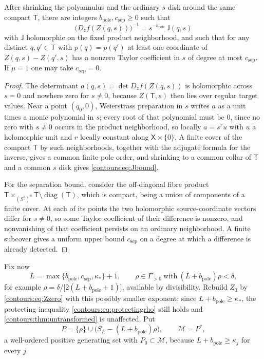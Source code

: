 \documentclass[11pt,letterpaper]{article}
\theoremstyle{definition}
\theoremstyle{remark}
\numberwithin{equation}{section}
\begin{document}
\begin{lemma}
\label{contours:lem:radialbounds}
After shrinking the polyannulus and the ordinary $s$ disk around the same compact
$\mathsf T$, there are integers $b_{\mathrm{pole}},c_{\mathrm{sep}}\ge0$ such
that
\begin{equation}\label{contours:eq:Jbound}
  \bigl(D_zf(Z(q,s))\bigr)^{-1}=s^{-b_{\mathrm{pole}}}\,\mathsf J(q,s)
\end{equation}
with $\mathsf J$ holomorphic on the fixed product neighborhood, and such that
for any distinct $q,q'\in\mathsf T$ with $p(q)=p(q')$ at least one coordinate of
$Z(q,s)-Z(q',s)$ has a nonzero Taylor coefficient in $s$ of degree at most
$c_{\mathrm{sep}}$. If $\mu=1$ one may take $c_{\mathrm{sep}}=0$.
\end{lemma}
\begin{proof}
The determinant $a(q,s)=\det D_zf(Z(q,s))$ is holomorphic across $s=0$ and
nowhere zero for $s\ne0$, because $Z(\mathsf T,s)$ then lies over regular target
values. Near a point $(q_0,0)$, Weierstrass preparation in $s$ writes $a$ as a
unit times a monic polynomial in $s$; every root of that polynomial must be $0$,
since no zero with $s\ne0$ occurs in the product neighborhood, so locally
$a=s^ru$ with $u$ a holomorphic unit and $r$ locally constant along
$\mathsf X\times\{0\}$. A finite cover of the compact $\mathsf T$ by such
neighborhoods, together with the adjugate formula for the inverse, gives a
common finite pole order, and shrinking to a common collar of $\mathsf T$ and a
common $s$ disk gives \eqref{contours:eq:Jbound}.

For the separation bound, consider the off-diagonal fibre product
$\mathsf T\times_{(S^1)^n}\mathsf T\setminus\operatorname{diag}(\mathsf T)$,
which is compact, being a union of components of a finite cover. At each of its
points the two holomorphic source-coordinate vectors differ for $s\ne0$, so some
Taylor coefficient of their difference is nonzero, and nonvanishing of that
coefficient persists on an ordinary neighborhood. A finite subcover gives a
uniform upper bound $c_{\mathrm{sep}}$ on a degree at which a difference is
already detected.
\end{proof}

Fix now
\begin{equation}\label{contours:eq:Lrho}
  L=\max\{b_{\mathrm{pole}},c_{\mathrm{sep}},\kappa_*\}+1,
  \qquad
  \rho\in\Gamma_{>0}\ \text{with}\ (L+b_{\mathrm{pole}})\rho<\delta ,
\end{equation}
for example $\rho=\delta/\bigl[2(L+b_{\mathrm{pole}}+1)\bigr]$, available by
divisibility. Rebuild $Z_0$ by \eqref{contours:eq:Zzero} with this possibly
smaller exponent; since $L+b_{\mathrm{pole}}\ge\kappa_*$, the protecting
inequality \eqref{contours:eq:protectingrho} still holds and
\cref{contours:thm:untransformed} is unaffected. Put
\begin{equation}\label{contours:eq:Pfull}
  P=\{\rho\}\cup\bigl(S_E-(L+b_{\mathrm{pole}})\rho\bigr),
  \qquad \mathcal M=P^* ,
\end{equation}
a well-ordered positive generating set with $P_0\subset\mathcal M$, because
$L+b_{\mathrm{pole}}\ge\kappa_j$ for every $j$.
\end{document}
